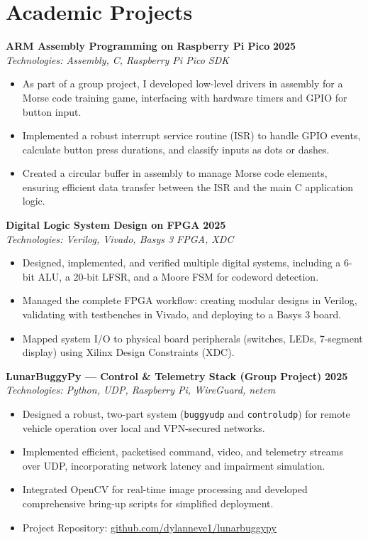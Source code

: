 \documentclass[10pt,a4paper]{article}
\begin{document}
\section*{Academic Projects}
\textbf{ARM Assembly Programming on Raspberry Pi Pico} \hfill \textbf{2025} \\
\textit{Technologies: Assembly, C, Raspberry Pi Pico SDK}
\begin{itemize}
    \item As part of a group project, I developed low-level drivers in assembly for a Morse code training game, interfacing with hardware timers and GPIO for button input.
    \item Implemented a robust interrupt service routine (ISR) to handle GPIO events, calculate button press durations, and classify inputs as dots or dashes.
    \item Created a circular buffer in assembly to manage Morse code elements, ensuring efficient data transfer between the ISR and the main C application logic.
\end{itemize}
\medskip
\textbf{Digital Logic System Design on FPGA} \hfill \textbf{2025} \\
\textit{Technologies: Verilog, Vivado, Basys 3 FPGA, XDC}
\begin{itemize}
    \item Designed, implemented, and verified multiple digital systems, including a 6-bit ALU, a 20-bit LFSR, and a Moore FSM for codeword detection.
    \item Managed the complete FPGA workflow: creating modular designs in Verilog, validating with testbenches in Vivado, and deploying to a Basys 3 board.
    \item Mapped system I/O to physical board peripherals (switches, LEDs, 7-segment display) using Xilinx Design Constraints (XDC).
\end{itemize}
\medskip
\textbf{LunarBuggyPy --- Control \& Telemetry Stack (Group Project)} \hfill \textbf{2025} \\
\textit{Technologies: Python, UDP, Raspberry Pi, WireGuard, netem}
\begin{itemize}
    \item Designed a robust, two-part system (\texttt{buggyudp} and \texttt{controludp}) for remote vehicle operation over local and VPN-secured networks.
    \item Implemented efficient, packetised command, video, and telemetry streams over UDP, incorporating network latency and impairment simulation.
    \item Integrated OpenCV for real-time image processing and developed comprehensive bring-up scripts for simplified deployment.
    \item Project Repository: \href{https://github.com/dylanneve1/lunarbuggypy}{github.com/dylanneve1/lunarbuggypy}
\end{itemize}
\end{document}
